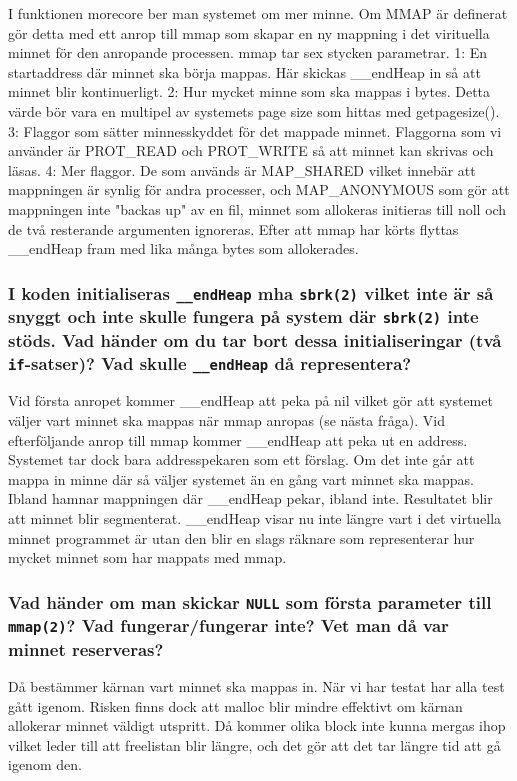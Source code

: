 \documentclass[a4paper]{article}
\begin{document}
I funktionen morecore ber man systemet om mer minne. Om MMAP är definerat gör detta med ett anrop till mmap som skapar en ny mappning i det virituella minnet för den anropande processen. mmap tar sex stycken parametrar. 1: En startaddress där minnet ska börja mappas. Här skickas \_\_endHeap in så att minnet blir kontinuerligt. 2: Hur mycket minne som ska mappas i bytes. Detta värde bör vara en multipel av systemets page size som hittas med getpagesize(). 3: Flaggor som sätter minnesskyddet för det mappade minnet. Flaggorna som vi använder är PROT\_READ och PROT\_WRITE så att minnet kan skrivas och läsas. 4: Mer flaggor. De som används är MAP\_SHARED vilket innebär att mappningen är synlig för andra processer, och MAP\_ANONYMOUS som gör att mappningen inte "backas up" av en fil, minnet som allokeras initieras till noll och de två resterande argumenten ignoreras. Efter att mmap har körts flyttas \_\_endHeap fram med lika många bytes som allokerades.

\subsubsection*{I koden initialiseras \texttt{\_\_endHeap} mha \texttt{sbrk(2)} vilket inte är så snyggt och inte skulle fungera på system där \texttt{sbrk(2)} inte stöds. Vad händer om du tar bort dessa initialiseringar (två \texttt{if}-satser)? Vad skulle \texttt{\_\_endHeap} då representera?}
Vid första anropet kommer \_\_endHeap att peka på nil vilket gör att systemet väljer vart minnet ska mappas när mmap anropas (se nästa fråga). Vid efterföljande anrop till mmap kommer \_\_endHeap att peka ut en address. Systemet tar dock bara addresspekaren som ett förslag. Om det inte går att mappa in minne där så väljer systemet än en gång vart minnet ska mappas. Ibland hamnar mappningen där \_\_endHeap pekar, ibland inte. Resultatet blir att minnet blir segmenterat. \_\_endHeap visar nu inte längre vart i det virtuella minnet programmet är utan den blir en slags räknare som representerar hur mycket minnet som har mappats med mmap.

\subsubsection*{Vad händer om man skickar \texttt{NULL} som första parameter till \texttt{mmap(2)}? Vad fungerar/fungerar inte? Vet man då var minnet reserveras?}
Då bestämmer kärnan vart minnet ska mappas in. När vi har testat har alla test gått igenom. Risken finns dock att malloc blir mindre effektivt om kärnan allokerar minnet väldigt utspritt. Då kommer olika block inte kunna mergas ihop vilket leder till att freelistan blir längre, och det gör att det tar längre tid att gå igenom den.
\end{document}
